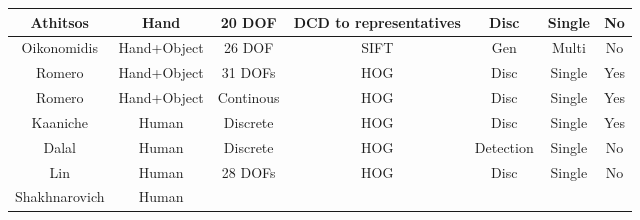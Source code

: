 \documentclass[a4paper,11pt]{kth-mag}
\begin{document}
\begin{table}[!ht]
{\begin{tabular}{|c|c|c|c|c|c|c|}
        Athitsos \cite{clutter} 
                                    & Hand
                                    & 20 DOF
                                    & DCD to representatives 
                                    & Disc
                                    & Single
                                    & No
        \\
        \hline
        Oikonomidis \cite{fullDOF}
                                    & Hand+Object
                                    & 26 DOF 
                                    & SIFT
                                    & Gen%
                                    & Multi 
                                    & No
        \\
        \hline
        Romero \cite{monocular}     
                                    & Hand+Object
                                    & 31 DOFs 
                                    & HOG %
                                    & Disc%
                                    & Single
                                    & Yes
        \\
        \hline
        Romero \cite{nonparametric} 
                                    & Hand+Object
                                    & Continous %
                                    & HOG
                                    & Disc 
                                    & Single
                                    & Yes
        \\
        \hline
        Kaaniche \cite{tracking}
                                    & Human
                                    & Discrete
                                    & HOG
                                    & Disc%
                                    & Single
                                    & Yes
        \\
        \hline
        Dalal \cite{HOG}    & Human 
                            & Discrete
                            & HOG
                            & Detection
                            & Single
                            & No
        \\
        \hline
        Lin \cite{humanBody} 
                                    & Human
                                    & 28 DOFs 
                                    & HOG
                                    & Disc 
                                    & Single 
                                    & No
        \\
        \hline
        Shakhnarovich \cite{PSH} 
                                    & Human

\end{tabular}}
\end{table}
\end{document}
